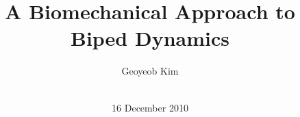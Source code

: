 \documentclass{acm_proc_article-sp}
\begin{document}
\title{A Biomechanical Approach to Biped Dynamics}
%
%
%
%
%

%
\author{
%
%
\alignauthor
\alignauthor
Geoyeob Kim\\
       \\
}

\date{16 December 2010}
\end{document}
